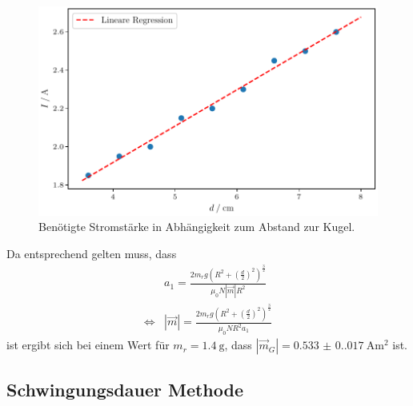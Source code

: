 \begin{figure}[H]
    \centering
    \includegraphics{plot1.pdf}
    \caption{Benötigte Stromstärke in Abhängigkeit zum Abstand zur Kugel.}
    \label{fig:grav}
\end{figure}
Da entsprechend gelten muss, dass
\begin{align}
    & a_1=\frac{2m_rg\left(R^2+\left(\frac{d}{2}\right)^2\right)^\frac{3}{2}}{\mu_0N|\vec{m}|R^2} \\
    \iff & |\vec{m}|=\frac{2m_rg\left(R^2+\left(\frac{d}{2}\right)^2\right)^\frac{3}{2}}{\mu_0NR^2a_1}
\end{align}
ist ergibt sich bei einem Wert für $m_r=\qty{1.4}{\gram}$, dass $|\vec{m}_G|=\qty{0.533(0.017)}{\ampere\meter\squared}$ ist.

\subsection{Schwingungsdauer Methode}

